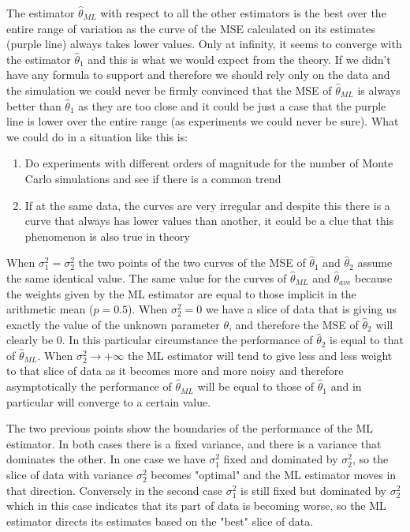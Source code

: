 The estimator $\hat \theta_{ML}$ with respect to all the other estimators is the best over the entire range of variation as the curve of the MSE calculated on its estimates (purple line) always takes lower values. Only at infinity, it seems to converge with the estimator $\hat \theta_1$ and this is what we would expect from the theory.
If we didn't have any formula to support and therefore we should rely only on the data and the simulation we could never be firmly convinced that the MSE of $\hat\theta_{ML}$ is always better than $\hat \theta_1$ as they are too close and it could be just a case that the purple line is lower over the entire range (as experiments we could never be sure). What we could do in a situation like this is:
\begin{enumerate}
    \item Do experiments with different orders of magnitude for the number of Monte Carlo simulations and see if there is a common trend
    \item If at the same data, the curves are very irregular and despite this there is a curve that always has lower values than another, it could be a clue that this phenomenon is also true in theory
\end{enumerate}
When $\sigma_1^2=\sigma_2^2$ the two points of the two curves of the MSE of $\hat\theta_1$ and $\hat\theta_2$ assume the same identical value. The same value for the curves of $\hat\theta_{ML}$ and $\hat\theta_{ave}$ because the weights given by the ML estimator are equal to those implicit in the arithmetic mean ($p=0.5$).
When $\sigma_2^2=0$ we have a slice of data that is giving us exactly the value of the unknown parameter $\theta$, and therefore the MSE of $\hat\theta_2$ will clearly be $0$. In this particular circumstance the performance of $\hat\theta_2$ is equal to that of $\hat\theta_{ML}$.
When $\sigma_2^2\to+\infty$ the ML estimator will tend to give less and less weight to that slice of data as it becomes more and more noisy and therefore asymptotically the performance of $\hat\theta_{ML}$ will be equal to those of $\hat \theta_1$ and in particular will converge to a certain value.

The two previous points show the boundaries of the performance of the ML estimator. In both cases there is a fixed variance, and there is a variance that dominates the other. In one case we have $\sigma_1^2$ fixed and dominated by $\sigma_2^2$, so the slice of data with variance $\sigma_2^2$ becomes "optimal" and the ML estimator moves in that direction. Conversely in the second case $\sigma_1^2$ is still fixed but dominated by $\sigma_2^2$ which in this case indicates that its part of data is becoming worse, so the ML estimator directs its estimates based on the "best" slice of data.

